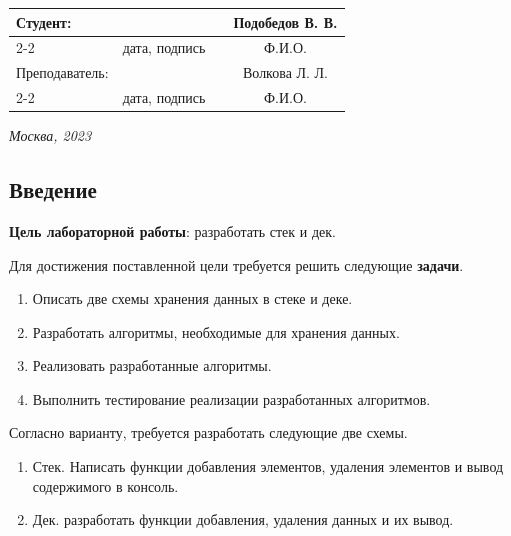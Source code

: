 \documentclass[12pt, a4paper]{article}
\begin{document}
\begin{titlepage}
  \fontsize{14}{21}\selectfont
  \vspace{5cm}


  \noindent\begin{tabularx}{\textwidth}{ X >{\centering}p{4cm} p{1cm} c }
   Студент: & & & Подобедов В. В. \\ \cline{2-2} \cline{4-4}
   & \fontsize{10}{15}\selectfont дата, подпись & & \fontsize{10}{15}\selectfont Ф.И.О. \\
   Преподаватель: & & & Волкова Л. Л.\\ \cline{2-2} \cline{4-4}
   & \fontsize{10}{15}\selectfont дата, подпись & & \fontsize{10}{15}\selectfont Ф.И.О.
  \end{tabularx}

  \vspace{\fill}

  \begin{center}
   \it{Москва}, 2023
  \end{center}

  \thispagestyle{empty}
\end{titlepage}

\renewcommand{\contentsname}{Содержание}
\setcounter{page}{2}
\tableofcontents

\newpage
\begin{center}
   \section*{Введение} 
\end{center}

\justifying
\textbf{Цель лабораторной работы}: разработать стек и дек.

Для достижения поставленной цели требуется решить следующие \textbf{задачи}.
\begin{enumerate}
\item Описать две схемы хранения данных в стеке и деке.
\item Разработать алгоритмы, необходимые для хранения данных.
\item Реализовать разработанные алгоритмы.
\item Выполнить тестирование реализации разработанных алгоритмов.
\end{enumerate}

Согласно варианту, требуется разработать следующие две схемы.
\begin{enumerate}
\item Стек. Написать функции добавления элементов, удаления элементов и вывод содержимого в консоль.
\item Дек. разработать функции добавления, удаления данных и их вывод.
\end{enumerate}
\end{document}

